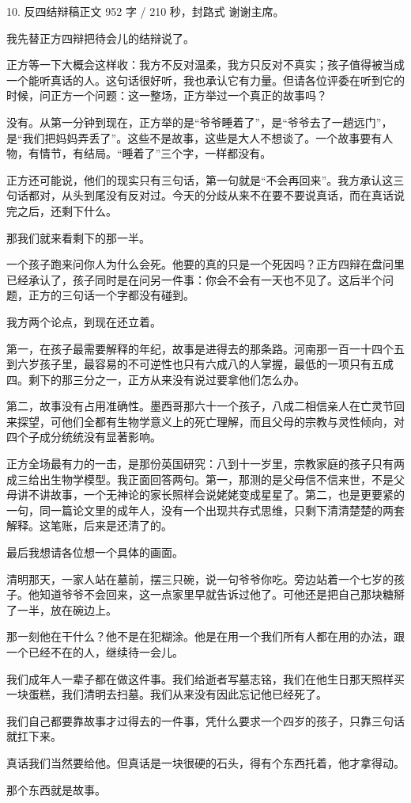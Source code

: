 \documentclass[script,con]{debate}
\begin{document}
\begin{speech}{10. 反四结辩稿}{正文 952 字 / 210 秒，封路式}
谢谢主席。

我先替正方四辩把待会儿的结辩说了。

正方等一下大概会这样收：我方不反对温柔，我方只反对不真实；孩子值得被当成一个能听真话的人。这句话很好听，我也承认它有力量。但请各位评委在听到它的时候，问正方一个问题：这一整场，正方举过一个真正的故事吗？

没有。从第一分钟到现在，正方举的是“爷爷睡着了”，是“爷爷去了一趟远门”，是“我们把妈妈弄丢了”。这些不是故事，这些是大人不想谈了。一个故事要有人物，有情节，有结局。“睡着了”三个字，一样都没有。

正方还可能说，他们的现实只有三句话，第一句就是“不会再回来”。我方承认这三句话都对，从头到尾没有反对过。今天的分歧从来不在要不要说真话，而在真话说完之后，还剩下什么。

那我们就来看剩下的那一半。

一个孩子跑来问你人为什么会死。他要的真的只是一个死因吗？正方四辩在盘问里已经承认了，孩子同时是在问另一件事：你会不会有一天也不见了。这后半个问题，正方的三句话一个字都没有碰到。

我方两个论点，到现在还立着。

第一，在孩子最需要解释的年纪，故事是进得去的那条路。河南那一百一十四个五到六岁孩子里，最容易的不可逆性也只有六成八的人掌握，最低的一项只有五成四。剩下的那三分之一，正方从来没有说过要拿他们怎么办。

第二，故事没有占用准确性。墨西哥那六十一个孩子，八成二相信亲人在亡灵节回来探望，可他们全都有生物学意义上的死亡理解，而且父母的宗教与灵性倾向，对四个子成分统统没有显著影响。

正方全场最有力的一击，是那份英国研究：八到十一岁里，宗教家庭的孩子只有两成三给出生物学模型。我正面回答两句。第一，那测的是父母信不信来世，不是父母讲不讲故事，一个无神论的家长照样会说姥姥变成星星了。第二，也是更要紧的一句，同一篇论文里的成年人，没有一个出现共存式思维，只剩下清清楚楚的两套解释。这笔账，后来是还清了的。


最后我想请各位想一个具体的画面。

清明那天，一家人站在墓前，摆三只碗，说一句爷爷你吃。旁边站着一个七岁的孩子。他知道爷爷不会回来，这一点家里早就告诉过他了。可他还是把自己那块糖掰了一半，放在碗边上。

那一刻他在干什么？他不是在犯糊涂。他是在用一个我们所有人都在用的办法，跟一个已经不在的人，继续待一会儿。

我们成年人一辈子都在做这件事。我们给逝者写墓志铭，我们在他生日那天照样买一块蛋糕，我们清明去扫墓。我们从来没有因此忘记他已经死了。

我们自己都要靠故事才过得去的一件事，凭什么要求一个四岁的孩子，只靠三句话就扛下来。

真话我们当然要给他。但真话是一块很硬的石头，得有个东西托着，他才拿得动。

那个东西就是故事。

\begin{contingency}
\end{contingency}
\end{speech}
\end{document}
